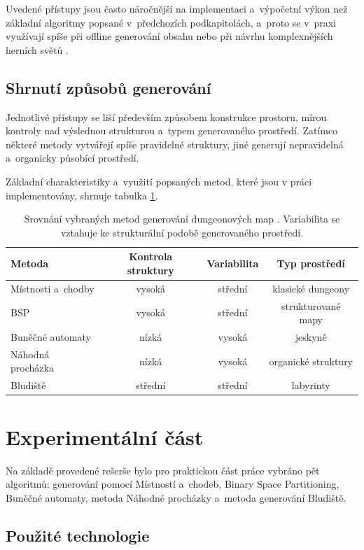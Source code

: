\documentclass[
   program=itk,
   biblatex,
   figures=true,
   tables=true,
   glossaries,
   index
]{kidiplom}
\begin{document}
Uvedené přístupy jsou často náročnější na implementaci a~výpočetní výkon než základní algoritmy popsané v~předchozích podkapitolách, a~proto se v~praxi využívají spíše při offline generování obsahu nebo při návrhu komplexnějších herních světů \cite{Linden2014,Shaker2016}.

\subsection{Shrnutí způsobů generování}

Jednotlivé přístupy se liší především způsobem konstrukce prostoru, mírou kontroly nad výslednou strukturou a~typem generovaného prostředí. Zatímco některé metody vytvářejí spíše pravidelné struktury, jiné generují nepravidelná a~organicky působící prostředí.

Základní charakteristiky a~využití popsaných metod, které jsou v práci implementovány, shrnuje tabulka \ref{tab:dungeon_methods}.

\begin{table}[H]
\centering
\begin{tabular}{|l|c|c|c|}
\hline
Metoda & Kontrola struktury & Variabilita & Typ prostředí \\ 
\hline
Místnosti a~chodby & vysoká & střední & klasické dungeony \\
BSP & vysoká & střední & strukturované mapy \\
Buněčné automaty & nízká & vysoká & jeskyně \\
Náhodná procházka & nízká & vysoká & organické struktury \\
Bludiště & střední & střední & labyrinty \\
\hline
\end{tabular}
\caption{Srovnání vybraných metod generování dungeonových map \cite{Linden2014,Shaker2016}. Variabilita se vztahuje ke strukturální podobě generovaného prostředí.}
\label{tab:dungeon_methods}
\end{table}

\section{Experimentální část}

Na základě provedené rešerše bylo pro praktickou část práce vybráno pět algoritmů: generování pomocí Místností a~chodeb, Binary Space Partitioning, Buněčné automaty, metoda Náhodné procházky a~metoda generování Bludiště.

\subsection{Použité technologie}
\end{document}
